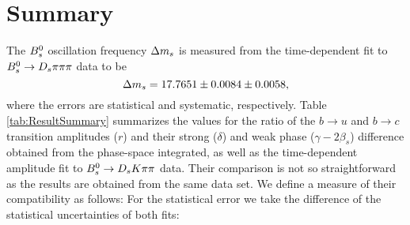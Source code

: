 \section{Summary}
\label{sec:Summary}


The ${{B}^0_{s}}$ oscillation frequency ${\Delta m_{{s}}}$ is measured from the time-dependent fit to ${{B}^0_{s}}\rightarrow{\ensuremath{{D}_{s}}}{\ensuremath{\pi}}{\ensuremath{\pi}}{\ensuremath{\pi}}$ data to be
\begin{equation*}
{\ensuremath{\Delta m_{{s}}}} = 17.7651 \pm 0.0084 \pm 0.0058,  
\end{equation*}
where the errors are statistical and systematic, respectively.
Table \ref{tab:ResultSummary} summarizes the values for the ratio of the $b\to u$ and $b\to c$ transition amplitudes ($r$)
and their strong ($\delta$) and weak phase ($\gamma -2 \beta_s$) difference 
obtained from the phase-space integrated, as well as the time-dependent amplitude fit to ${{B}^0_{s}}\rightarrow{\ensuremath{{D}_{s}}}{\ensuremath{K}}{\ensuremath{\pi}}{\ensuremath{\pi}}$ data.
%
Their comparison is not so straightforward as the results are obtained from the same data set. 
We define a measure of their compatibility as follows:
For the statistical error we take the difference of the statistical uncertainties of both fits:
